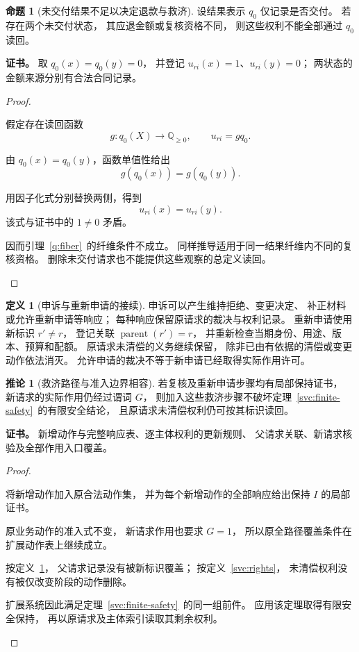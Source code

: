 \documentclass[UTF8,12pt,a4paper,openany,fontset=none,zihao=false]{ctexrep}
\theoremstyle{definition}
\newtheorem{definition}{定义}[chapter]
\newtheorem{proposition}{命题}[chapter]
\newtheorem{corollary}{推论}[chapter]
\newenvironment{certificate}{\par\noindent\textbf{证书。}\ignorespaces}{\par}
\newcommand{\1}{\mathbf 1}
\begin{document}
\begin{proposition}[未交付结果不足以决定退款与救济]
\label{svc:failure-observation}
设结果表示 \(q_0\) 仅记录是否交付。
若存在两个未交付状态，
其应退金额或复核资格不同，
则这些权利不能全部通过 \(q_0\) 读回。
\end{proposition}
\begin{certificate}
取 \(q_0(x)=q_0(y)=0\)，
并登记 \(u_{ri}(x)=1\)、\(u_{ri}(y)=0\)；
两状态的金额来源分别有合法合同记录。
\end{certificate}
\begin{proof}
\begin{semanticsteps}
\item 假定存在读回函数
\[
g:q_0(X)\longrightarrow\mathbb Q_{\ge0},
\qquad u_{ri}=gq_0.
\]
\item 由 \(q_0(x)=q_0(y)\)，函数单值性给出
\[
g(q_0(x))=g(q_0(y)).
\]
\item 用因子化式分别替换两侧，得到
\[
u_{ri}(x)=u_{ri}(y).
\]
该式与证书中的 \(1\ne0\) 矛盾。
\item 因而引理~\ref{q:fiber}~的纤维条件不成立。
同样推导适用于同一结果纤维内不同的复核资格。
删除未交付请求也不能提供这些观察的总定义读回。
\end{semanticsteps}
\end{proof}

\begin{definition}[申诉与重新申请的接续]
\label{svc:reentry}
申诉可以产生维持拒绝、变更决定、
补正材料或允许重新申请等响应；
每种响应保留原请求的裁决与权利记录。
重新申请使用新标识 \(r'\ne r\)，
登记关联 \(\operatorname{parent}(r')=r\)，
并重新检查当期身份、用途、版本、预算和配额。
原请求未清偿的义务继续保留，
除非已由有依据的清偿或变更动作依法消灭。
允许申请的裁决不等于新申请已经取得实际作用许可。
\end{definition}

\begin{corollary}[救济路径与准入边界相容]
\label{svc:remedy-compatibility}
若复核及重新申请步骤均有局部保持证书，
新请求的实际作用仍经过谓词 \(G\)，
则加入这些救济步骤不破坏定理~\ref{svc:finite-safety}~的有限安全结论，
且原请求未清偿权利仍可按其标识读回。
\end{corollary}
\begin{certificate}
新增动作与完整响应表、逐主体权利的更新规则、
父请求关联、新请求核验及全部作用入口覆盖。
\end{certificate}
\begin{proof}
\begin{semanticsteps}
\item 将新增动作加入原合法动作集，
并为每个新增动作的全部响应给出保持 \(I\) 的局部证书。
\item 原业务动作的准入式不变，
新请求作用也要求 \(G=1\)，
所以原全路径覆盖条件在扩展动作表上继续成立。
\item 按定义~\ref{svc:reentry}，
父请求记录没有被新标识覆盖；
按定义~\ref{svc:rights}，
未清偿权利没有被仅改变阶段的动作删除。
\item 扩展系统因此满足定理~\ref{svc:finite-safety}~的同一组前件。
应用该定理取得有限安全保持，
再以原请求及主体索引读取其剩余权利。
\end{semanticsteps}
\end{proof}
\end{document}
